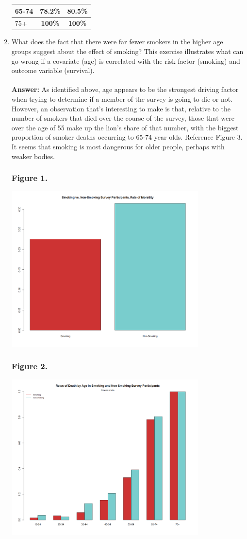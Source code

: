 \documentclass{article}
\begin{document}
\begin{enumerate}[\ \ (a)\ ]
\begin{tabular}{|l|c|c|}
			\hline
			65-74 & 78.2\% & \textbf{80.5\%} \\
			\hline
			  75+ & \textbf{100\%} &\textbf{ 100\%} \\
			\hline
		\end{tabular}
		\item What does the fact that there were far fewer smokers in the higher age groups suggest about the effect of smoking? This exercise illustrates what can go wrong if a covariate (age) is correlated with the risk factor (smoking) and outcome variable (survival).\\\\
		\textbf{Answer:}  As identified above, age appears to be the strongest driving factor when trying to determine if a member of the survey is going to die or not. However, an observation that's interesting to make is that, relative to the number of smokers that died over the course of the survey, those that were over the age of 55 make up the lion's share of that number, with the biggest proportion of smoker deaths occurring to 65-74 year olds. Reference Figure 3. It seems that smoking is most dangerous for older people, perhaps with weaker bodies.
		\subsubsection*{Figure 1.}
		\includegraphics[width=4in]{P1.png}
		\subsubsection*{Figure 2.}
		\includegraphics[width=4in]{P2.png}

\end{enumerate}
\end{document}
